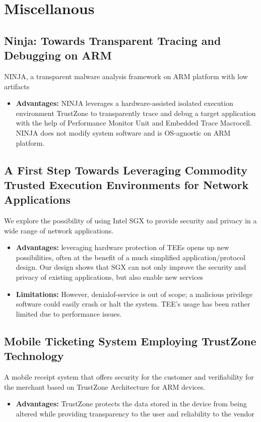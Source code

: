 \documentclass[conference]{IEEEtran}
\begin{document}
\section{Miscellanous}

\subsection{Ninja: Towards Transparent Tracing and Debugging on ARM}
NINJA, a transparent malware analysis framework on ARM platform with low artifacts
\begin{itemize}
    \item \textbf{Advantages:} NINJA leverages a hardware-assisted isolated execution environment TrustZone to transparently trace and debug a target application with the help of Performance Monitor Unit and Embedded Trace Macrocell. NINJA does not modify system software and is OS-agnostic on ARM platform.
\end{itemize}


\subsection{A First Step Towards Leveraging Commodity Trusted Execution Environments for Network Applications}
We explore the possibility of using Intel SGX to provide security and privacy in a wide range of network applications.
\begin{itemize}
    \item \textbf{Advantages:} leveraging hardware protection of TEEs opens up new possibilities, often at the benefit of a much simplified application/protocol design. Our design shows that SGX can not only improve the security and privacy of existing applications, but also enable new services
    \item \textbf{Limitations:} However, denialof-service is out of scope; a malicious privilege software could easily crash or halt the system. TEE’s usage has been rather limited due to performance issues.
\end{itemize}


\subsection{Mobile Ticketing System Employing TrustZone Technology}
A mobile receipt system that offers security for the customer and verifiability for the merchant based on TrustZone Architecture for ARM devices.
\begin{itemize}
    \item \textbf{Advantages:} TrustZone protects the data stored in the device from being altered while providing transparency to the user and reliability to the vendor
\end{itemize}
\end{document}
